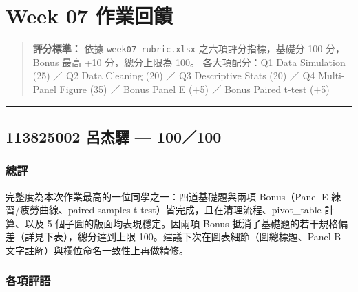 \documentclass[
  14pt,
]{extarticle}
\author{}
\date{}
\begin{document}
\hypertarget{week-07-ux4f5cux696dux56deux994b}{%
\section{Week 07 作業回饋}\label{week-07-ux4f5cux696dux56deux994b}}

\begin{quote}
\textbf{評分標準：} 依據 \texttt{week07\_rubric.xlsx}
之六項評分指標，基礎分 100 分，Bonus 最高 +10 分，總分上限為 100。
各大項配分：Q1 Data Simulation (25) ／ Q2 Data Cleaning (20) ／ Q3
Descriptive Stats (20) ／ Q4 Multi-Panel Figure (35) ／ Bonus Panel E
(+5) ／ Bonus Paired t-test (+5)
\end{quote}

\begin{center}\rule{0.5\linewidth}{0.5pt}\end{center}

\hypertarget{ux5442ux6770ux9a5b-100100}{%
\subsection{113825002 呂杰驛 ---
100／100}\label{ux5442ux6770ux9a5b-100100}}

\hypertarget{ux7e3dux8a55}{%
\subsubsection{總評}\label{ux7e3dux8a55}}

完整度為本次作業最高的一位同學之一：四道基礎題與兩項 Bonus（Panel E
練習/疲勞曲線、paired-samples t-test）皆完成，且在清理流程、pivot\_table
計算、以及 5 個子圖的版面均表現穩定。因兩項 Bonus
抵消了基礎題的若干規格偏差（詳見下表），總分達到上限
100。建議下次在圖表細節（圖總標題、Panel B
文字註解）與欄位命名一致性上再做精修。

\hypertarget{ux5404ux9805ux8a55ux8a9e}{%
\subsubsection{各項評語}\label{ux5404ux9805ux8a55ux8a9e}}
\end{document}

